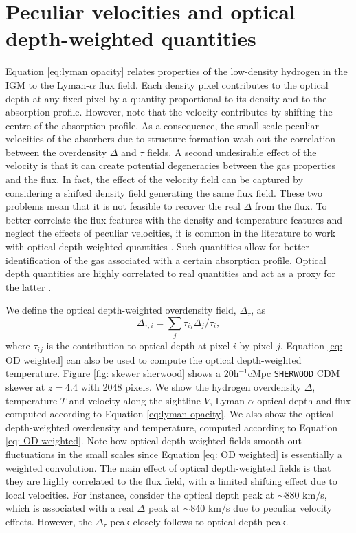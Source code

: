 \section{Peculiar velocities and optical depth-weighted quantities}\label{sec: optical depth weighted}
Equation \ref{eq:lyman opacity} relates properties of the low-density hydrogen in the IGM to the Lyman-$\alpha$ flux field. Each density pixel contributes to the optical depth at any fixed pixel by a quantity proportional to its density and to the absorption profile. However, note that the velocity contributes by shifting the centre of the absorption profile. As a consequence, the small-scale peculiar velocities of the absorbers due to structure formation wash out the correlation between the overdensity $\Delta$ and $\tau$ fields. A second undesirable effect of the velocity is that it can create potential degeneracies between the gas properties and the flux. In fact, the effect of the velocity field can be captured by considering a shifted density field generating the same flux field. These two problems mean that it is not feasible to recover the real $\Delta$ from the flux. To better correlate the flux features with the density and temperature features and neglect the effects of peculiar velocities, it is common in the literature to work with optical depth-weighted quantities \cite{_oltinsk__2021}. Such quantities allow for better identification of the gas associated with a certain absorption profile. Optical depth quantities are highly correlated to real quantities and act as a proxy for the latter \cite{Schaye1999}.

We define the optical depth-weighted overdensity field, $\Delta_\tau$, as
\begin{equation}\label{eq: OD weighted}
        \Delta_{\tau,i}=\sum_j \tau_{ij} \Delta_j /\tau_i,
\end{equation}
where $\tau_{ij}$ is the contribution to optical depth at pixel $i$ by pixel $j$. Equation \ref{eq: OD weighted} can also be used to compute the optical depth-weighted temperature. Figure \ref{fig: skewer sherwood} shows a 20h$^{-1}$cMpc \texttt{SHERWOOD} CDM skewer at $z=4.4$ with 2048 pixels. We show the hydrogen overdensity $\Delta$, temperature $T$ and velocity along the sightline $V$, Lyman-$\alpha$ optical depth and flux computed according to Equation \ref{eq:lyman opacity}. We also show the optical depth-weighted overdensity and temperature, computed according to Equation \ref{eq: OD weighted}. Note how optical depth-weighted fields smooth out fluctuations in the small scales since Equation \ref{eq: OD weighted} is essentially a weighted convolution. The main effect of optical depth-weighted fields is that they are highly correlated to the flux field, with a limited shifting effect due to local velocities. For instance, consider the optical depth peak at $\sim$880 km/s, which is associated with a real $\Delta$ peak at $\sim$840 km/s due to peculiar velocity effects. However, the $\Delta_\tau$ peak closely follows to optical depth peak.

